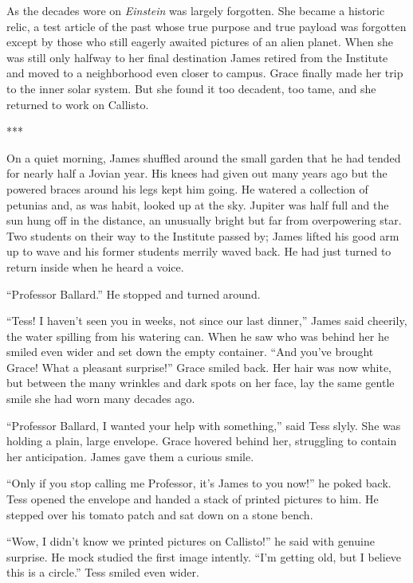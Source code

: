 \documentclass[12pt]{article} %
\begin{document}
As the decades wore on \textit{Einstein} was largely forgotten. She became a historic relic, a test article of the past whose true purpose and true payload was forgotten except by those who still eagerly awaited pictures of an alien planet. When she was still only halfway to her final destination James retired from the Institute and moved to a neighborhood even closer to campus. Grace finally made her trip to the inner solar system. But she found it too decadent, too tame, and she returned to work on Callisto.

\begin{center}
***
\end{center}

On a quiet morning, James shuffled around the small garden that he had tended for nearly half a Jovian year. His knees had given out many years ago but the powered braces around his legs kept him going. He watered a collection of petunias and, as was habit, looked up at the sky. Jupiter was half full and the sun hung off in the distance, an unusually bright but far from overpowering star. Two students on their way to the Institute passed by; James lifted his good arm up to wave and his former students merrily waved back. He had just turned to return inside when he heard a voice.

``Professor Ballard.'' He stopped and turned around.

``Tess! I haven't seen you in weeks, not since our last dinner,'' James said cheerily, the water spilling from his watering can. When he saw who was behind her he smiled even wider and set down the empty container. ``And you've brought Grace! What a pleasant surprise!'' Grace smiled back. Her hair was now white, but between the many wrinkles and dark spots on her face, lay the same gentle smile she had worn many decades ago. 

``Professor Ballard, I wanted your help with something,'' said Tess slyly. She was holding a plain, large envelope. Grace hovered behind her, struggling to contain her anticipation. James gave them a curious smile.

``Only if you stop calling me Professor, it's James to you now!'' he poked back. Tess opened the envelope and handed a stack of printed pictures to him. He stepped over his tomato patch and sat down on a stone bench.

``Wow, I didn't know we printed pictures on Callisto!'' he said with genuine surprise. He mock studied the first image intently. ``I'm getting old, but I believe this is a circle.'' Tess smiled even wider.
\end{document}
